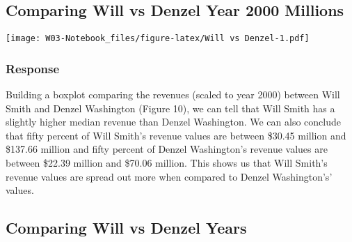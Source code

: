 \documentclass[
]{article}
\newenvironment{Shaded}{\begin{snugshade}}{\end{snugshade}}
\newcommand{\DataTypeTok}[1]{\textcolor[rgb]{0.13,0.29,0.53}{#1}}
\newcommand{\FloatTok}[1]{\textcolor[rgb]{0.00,0.00,0.81}{#1}}
\newcommand{\KeywordTok}[1]{\textcolor[rgb]{0.13,0.29,0.53}{\textbf{#1}}}
\newcommand{\NormalTok}[1]{#1}
\newcommand{\OperatorTok}[1]{\textcolor[rgb]{0.81,0.36,0.00}{\textbf{#1}}}
\newcommand{\StringTok}[1]{\textcolor[rgb]{0.31,0.60,0.02}{#1}}
\begin{document}
\hypertarget{comparing-will-vs-denzel-year-2000-millions}{%
\subsection{Comparing Will vs Denzel Year 2000
Millions}\label{comparing-will-vs-denzel-year-2000-millions}}

\begin{Shaded}
\end{Shaded}

\texttt{[image: W03-Notebook\_files/figure-latex/Will vs Denzel-1.pdf]}

\hypertarget{response-3}{%
\subsubsection{Response}\label{response-3}}

Building a boxplot comparing the revenues (scaled to year 2000) between
Will Smith and Denzel Washington (Figure 10), we can tell that Will
Smith has a slightly higher median revenue than Denzel Washington. We
can also conclude that fifty percent of Will Smith's revenue values are
between \$30.45 million and \$137.66 million and fifty percent of Denzel
Washington's revenue values are between \$22.39 million and \$70.06
million. This shows us that Will Smith's revenue values are spread out
more when compared to Denzel Washington's' values.

\hypertarget{comparing-will-vs-denzel-years}{%
\subsection{Comparing Will vs Denzel
Years}\label{comparing-will-vs-denzel-years}}

\begin{Shaded}
\end{Shaded}
\end{document}
